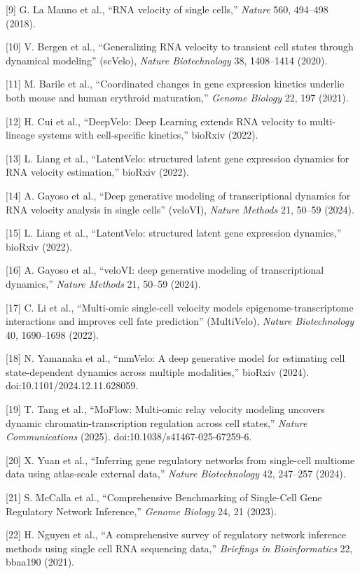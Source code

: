 \documentclass[
]{article}
\begin{document}
{[}9{]} G. La Manno et al., ``RNA velocity of single cells,''
\emph{Nature} 560, 494--498 (2018).

{[}10{]} V. Bergen et al., ``Generalizing RNA velocity to transient cell
states through dynamical modeling'' (scVelo), \emph{Nature
Biotechnology} 38, 1408--1414 (2020).

{[}11{]} M. Barile et al., ``Coordinated changes in gene expression
kinetics underlie both mouse and human erythroid maturation,''
\emph{Genome Biology} 22, 197 (2021).

{[}12{]} H. Cui et al., ``DeepVelo: Deep Learning extends RNA velocity
to multi-lineage systems with cell-specific kinetics,'' bioRxiv (2022).

{[}13{]} L. Liang et al., ``LatentVelo: structured latent gene
expression dynamics for RNA velocity estimation,'' bioRxiv (2022).

{[}14{]} A. Gayoso et al., ``Deep generative modeling of transcriptional
dynamics for RNA velocity analysis in single cells'' (veloVI),
\emph{Nature Methods} 21, 50--59 (2024).

{[}15{]} L. Liang et al., ``LatentVelo: structured latent gene
expression dynamics,'' bioRxiv (2022).

{[}16{]} A. Gayoso et al., ``veloVI: deep generative modeling of
transcriptional dynamics,'' \emph{Nature Methods} 21, 50--59 (2024).

{[}17{]} C. Li et al., ``Multi-omic single-cell velocity models
epigenome-transcriptome interactions and improves cell fate prediction''
(MultiVelo), \emph{Nature Biotechnology} 40, 1690--1698 (2022).

{[}18{]} N. Yamanaka et al., ``mmVelo: A deep generative model for
estimating cell state-dependent dynamics across multiple modalities,''
bioRxiv (2024). doi:10.1101/2024.12.11.628059.

{[}19{]} T. Tang et al., ``MoFlow: Multi-omic relay velocity modeling
uncovers dynamic chromatin-transcription regulation across cell
states,'' \emph{Nature Communications} (2025).
doi:10.1038/s41467-025-67259-6.

{[}20{]} X. Yuan et al., ``Inferring gene regulatory networks from
single-cell multiome data using atlas-scale external data,''
\emph{Nature Biotechnology} 42, 247--257 (2024).

{[}21{]} S. McCalla et al., ``Comprehensive Benchmarking of Single-Cell
Gene Regulatory Network Inference,'' \emph{Genome Biology} 24, 21
(2023).

{[}22{]} H. Nguyen et al., ``A comprehensive survey of regulatory
network inference methods using single cell RNA sequencing data,''
\emph{Briefings in Bioinformatics} 22, bbaa190 (2021).
\end{document}
